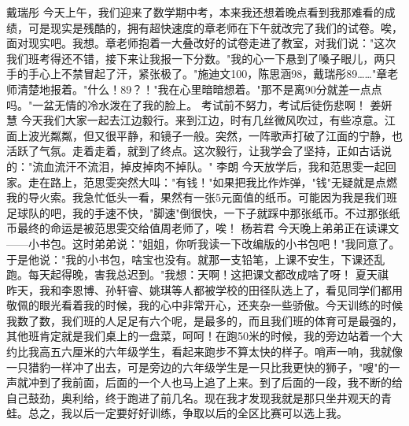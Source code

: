 {}\markdownRendererInterblockSeparator
{}戴瑞彤\markdownRendererInterblockSeparator
{}今天上午，我们迎来了数学期中考，本来我还想着晚点看到我那难看的成绩，可是现实是残酷的，拥有超快速度的章老师在下午就改完了我们的试卷。唉，面对现实吧。我想。章老师抱着一大叠改好的试卷走进了教室，对我们说："这次我们班考得还不错，接下来让我报一下分数。"我的心一下悬到了嗓子眼儿，两只手的手心上不禁冒起了汗，紧张极了。"施迪文100，陈思涵98，戴瑞彤89……"章老师清楚地报着。"什么！89？！"我在心里暗暗想着。"那不是离90分就差一点点吗。"一盆无情的冷水泼在了我的脸上。\markdownRendererInterblockSeparator
{}考试前不努力，考试后徒伤悲啊！\markdownRendererInterblockSeparator
{}\markdownRendererInterblockSeparator
{}姜姸慧\markdownRendererInterblockSeparator
{}今天我们大家一起去江边毅行。来到江边，时有几丝微风吹过，有些凉意。江面上波光粼粼，但又很平静，和镜子一般。突然，一阵歌声打破了江面的宁静，也活跃了气氛。走着走着，就到了终点。这次毅行，让我学会了坚持，正如古话说的："流血流汗不流泪，掉皮掉肉不掉队。"\markdownRendererInterblockSeparator
{}\markdownRendererInterblockSeparator
{}李朗\markdownRendererInterblockSeparator
{}今天放学后，我和范思雯一起回家。走在路上，范思雯突然大叫："有钱！"如果把我比作炸弹，"钱"无疑就是点燃我的导火索。我急忙低头一看，果然有一张5元面值的纸币。可能因为我是我们班足球队的吧，我的手速不快，"脚速"倒很快，一下子就踩中那张纸币。不过那张纸币最终的命运是被范思雯交给值周老师了，唉！\markdownRendererInterblockSeparator
{}\markdownRendererInterblockSeparator
{}杨若君\markdownRendererInterblockSeparator
{}今天晚上弟弟正在读课文——小书包。这时弟弟说："姐姐，你听我读一下改编版的小书包吧！"我同意了。于是他说："我的小书包，啥宝也没有。就那一支铅笔，上课不安生，下课还乱跑。每天起得晚，害我总迟到。"我想：天啊！这把课文都改成啥了呀！\markdownRendererInterblockSeparator
{}\markdownRendererInterblockSeparator
{}夏天祺\markdownRendererInterblockSeparator
{}昨天，我和李恩博、孙轩睿、姚琪等人都被学校的田径队选上了，看见同学们都用敬佩的眼光看着我的时候，我的心中非常开心，还夹杂一些骄傲。今天训练的时候我数了数，我们班的人足足有六个呢，是最多的，而且我们班的体育可是最强的，其他班肯定就是我们桌上的一盘菜，呵呵！在跑50米的时候，我的旁边站着一个大约比我高五六厘米的六年级学生，看起来跑步不算太快的样子。哨声一响，我就像一只猎豹一样冲了出去，可是旁边的六年级学生是一只比我更快的狮子，"嗖"的一声就冲到了我前面，后面的一个人也马上追了上来。到了后面的一段，我不断的给自己鼓劲，奥利给，终于跑进了前几名。现在我才发现我就是那只坐井观天的青蛙。总之，我以后一定要好好训练，争取以后的全区比赛可以选上我。\markdownRendererInterblockSeparator
